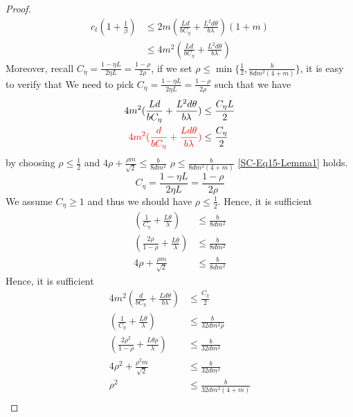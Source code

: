 \documentclass{article}
\theoremstyle{definition}
\theoremstyle{remark}
\begin{document}
{\begin{proof}
\begin{equation}\label{SC-Eq15-Lemma1}
\begin{split}
c_{t}(1+\frac{1}{\beta})&\leq 2m(\frac{Ld}{bC_{\eta} }+\frac{L^2d\theta}{b\lambda })(1+m)\\
&\leq 4m^2(\frac{Ld}{bC_{\eta} }+\frac{L^2d\theta}{b\lambda })
\end{split}
\end{equation}\label{SC-Eq16-Lemma1}
Moreover, recall $C_{\eta} = \frac{1-\eta L}{2\eta L} = \frac{1-\rho}{2\rho}$, if we set $\rho\leq \min\{\frac{1}{2},\frac{b}{8dm^2(4+m)}\}$, it is easy to verify that
 {\color{red}We need to pick  $C_{\eta} = \frac{1-\eta L}{2\eta L} = \frac{1-\rho}{2\rho}$ such that we have}
\begin{align}
 4m^2(\frac{Ld}{bC_{\eta} }+\frac{L^2d\theta}{b\lambda }) &\leq \frac{C_{\eta} L}{2}\label{SC-Eq16-Lemma1}\\
 {\color{red} 4m^2(\frac{d}{bC_{\eta} }+\frac{Ld\theta}{b\lambda })} &\leq \frac{C_{\eta}}{2}\notag
\end{align}
 by choosing $\rho \leq \frac{1}{2}$ and $4\rho+ \frac{\rho m}{\sqrt{2}}\leq \frac{b}{8dm^2}$
{\color{blue}$\rho \leq \frac{b}{8dm^2(4+m)}$}
\eqref{SC-Eq15-Lemma1}  holds. 
{\color{red}
\[
C_{\eta} = \frac{1-\eta L}{2\eta L} = \frac{1-\rho}{2\rho}
\]
We assume $C_{\eta} \geq 1$ and thus we should have $\rho \leq \frac{1}{2}$.
}
{\color{red}
Hence, it is sufficient
\begin{equation}
\begin{split}
  (\frac{1}{C_{\eta} }+\frac{L\theta}{\lambda }) &\leq \frac{b}{8dm^2}\\
    (\frac{2\rho}{1-\rho}+\frac{L\theta}{\lambda }) &\leq \frac{b}{8dm^2}\\
  4\rho+ \frac{\rho m}{\sqrt{2}}&\leq \frac{b}{8dm^2}
\end{split}
\end{equation}
}
{\color{Brown}
Hence, it is sufficient
\begin{equation}
\begin{split}
4m^2(\frac{d}{bC_{\eta} }+\frac{Ld\theta}{b\lambda }) &\leq \frac{C_{\eta}}{2}\\
  (\frac{1}{C_{\eta} }+\frac{L\theta}{\lambda }) &\leq \frac{b}{32dm^2\rho}\\
    (\frac{2\rho^2}{1-\rho}+\frac{L\theta\rho}{\lambda }) &\leq \frac{b}{32dm^2}\\
  4\rho^2+ \frac{\rho^2 m}{\sqrt{2}}&\leq \frac{b}{32dm^2}\\
  \rho^2 &\leq \frac{b}{32dm^2(4+m)}\\

\end{split}
\end{equation}}
\end{proof}}
\end{document}
